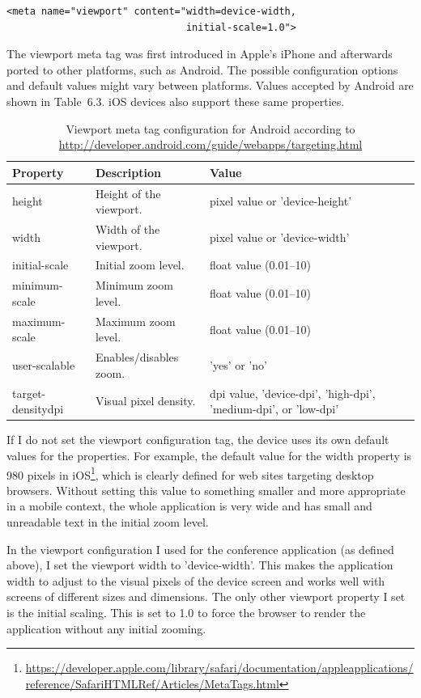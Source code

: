 \begin{verbatim}
<meta name="viewport" content="width=device-width,
                               initial-scale=1.0">
\end{verbatim}

The viewport meta tag was first introduced in Apple's iPhone and
afterwards ported to other platforms, such as Android. The possible
configuration options and default values might vary between
platforms. Values accepted by Android are shown in
Table~6.3\tableref. iOS devices also support these same properties.

\begin{table}
  \begin{tabular}{ l | l | p{5cm} }
    \textbf{Property} & \textbf{Description} & \textbf{Value} \\ \hline
    height & Height of the viewport. & pixel value or 'device-height' \\
    width & Width of the viewport. & pixel value or 'device-width' \\
    initial-scale & Initial zoom level. & float value (0.01--10) \\
    minimum-scale & Minimum zoom level. & float value (0.01--10) \\
    maximum-scale & Maximum zoom level. & float value (0.01--10) \\
    user-scalable & Enables/disables zoom. & 'yes' or 'no' \\
    target-densitydpi & Visual pixel density. & dpi value, 'device-dpi', 'high-dpi', 'medium-dpi', or 'low-dpi' \\
  \end{tabular}
  \label{table:viewport-meta}
  \caption{Viewport meta tag configuration for Android according to
    \url{http://developer.android.com/guide/webapps/targeting.html}}
\end{table}

If I do not set the viewport configuration tag, the device uses its
own default values for the properties. For example, the default value
for the width property is 980 pixels in
iOS\footnote{\url{https://developer.apple.com/library/safari/documentation/appleapplications/reference/SafariHTMLRef/Articles/MetaTags.html}},
which is clearly defined for web sites targeting desktop
browsers. Without setting this value to something smaller and more
appropriate in a mobile context, the whole application is very wide
and has small and unreadable text in the initial zoom level.

In the viewport configuration I used for the conference application
(as defined above), I set the viewport width to 'device-width'. This
makes the application width to adjust to the visual pixels of the
device screen and works well with screens of different sizes and
dimensions. The only other viewport property I set is the initial
scaling. This is set to 1.0 to force the browser to render the
application without any initial zooming.

